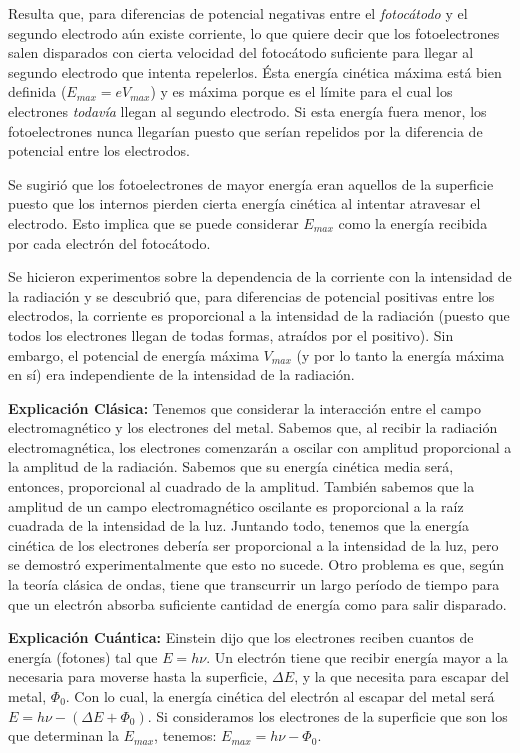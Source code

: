 \documentclass{article}
\begin{document}
Resulta que, para diferencias de potencial negativas entre el \emph{fotocátodo} y el segundo electrodo aún existe corriente, lo que quiere decir que los fotoelectrones salen disparados con cierta velocidad del fotocátodo suficiente para llegar al segundo electrodo que intenta repelerlos. Ésta energía cinética máxima está bien definida ($E_{max}=eV_{max}$) y es máxima porque es el límite para el cual los electrones \emph{todavía} llegan al segundo electrodo. Si esta energía fuera menor, los fotoelectrones nunca llegarían puesto que serían repelidos por la diferencia de potencial entre los electrodos.

Se sugirió que los fotoelectrones de mayor energía eran aquellos de la superficie puesto que los internos pierden cierta energía cinética al intentar atravesar el electrodo. Esto implica que se puede considerar $E_{max}$ como la energía recibida por cada electrón del fotocátodo.

Se hicieron experimentos sobre la dependencia de la corriente con la intensidad de la radiación y se descubrió que, para diferencias de potencial positivas entre los electrodos, la corriente es proporcional a la intensidad de la radiación (puesto que todos los electrones llegan de todas formas, atraídos por el positivo). Sin embargo, el potencial de energía máxima $V_{max}$ (y por lo tanto la energía máxima en sí) era independiente de la intensidad de la radiación.

\textbf{Explicación Clásica:}
Tenemos que considerar la interacción entre el campo electromagnético y los electrones del metal.
Sabemos que, al recibir la radiación electromagnética, los electrones comenzarán a oscilar con amplitud proporcional a la amplitud de la radiación.
Sabemos que su energía cinética media será, entonces, proporcional al cuadrado de la amplitud. También sabemos que la amplitud de un campo electromagnético oscilante es proporcional a la raíz cuadrada de la intensidad de la luz.
Juntando todo, tenemos que la energía cinética de los electrones debería ser proporcional a la intensidad de la luz, pero se demostró experimentalmente que esto no sucede.
Otro problema es que, según la teoría clásica de ondas, tiene que transcurrir un largo período de tiempo para que un electrón absorba suficiente cantidad de energía como para salir disparado.

\textbf{Explicación Cuántica:}
Einstein dijo que los electrones reciben cuantos de energía (fotones) tal que $E = h \nu$. Un electrón tiene que recibir energía mayor a la necesaria para moverse hasta la superficie, $\Delta E$, y la que necesita para escapar del metal, $\Phi_{0}$. Con lo cual, la energía cinética del electrón al escapar del metal será $E = h \nu - (\Delta E + \Phi_{0})$. Si consideramos los electrones de la superficie que son los que determinan la $E_{max}$, tenemos: $E_{max} = h \nu - \Phi_{0}$.
\end{document}
